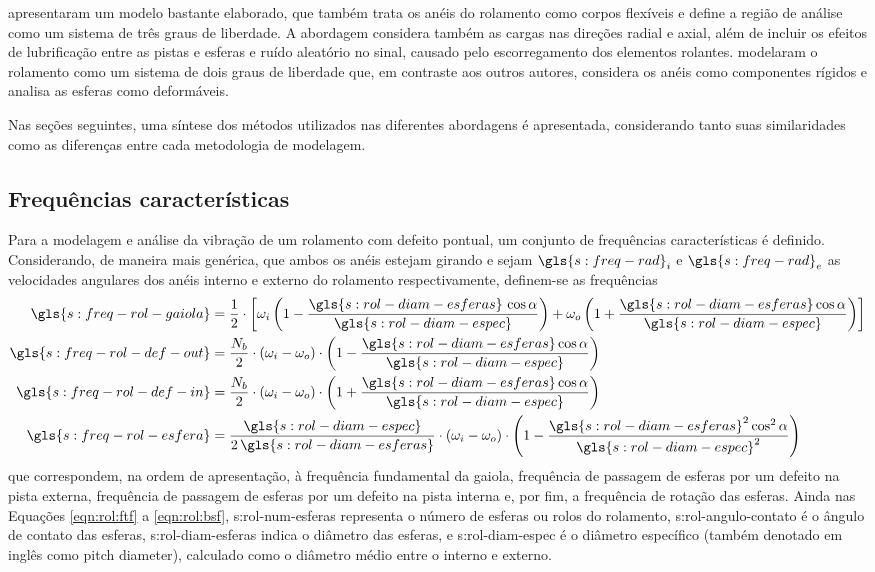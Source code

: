 \documentclass[12pt,openright,oneside,a4paper,
	chapter=TITLE,section=TITLE,
	english,brazil]{abntex2}
\begin{document}
	\citeauthor{sassi:2007} apresentaram um modelo bastante elaborado, que também trata os anéis do rolamento como corpos flexíveis e define a região de análise como um sistema de três graus de liberdade. A abordagem considera também as cargas nas direções radial e axial, além de incluir os efeitos de lubrificação entre as pistas e esferas e ruído aleatório no sinal, causado pelo escorregamento dos elementos rolantes.	\citeauthor{patil:2010} modelaram o rolamento como um sistema de dois graus de liberdade que, em contraste aos outros autores, considera os anéis como componentes rígidos e analisa as esferas como deformáveis.
	
	Nas seções seguintes, uma síntese dos métodos utilizados nas diferentes abordagens é apresentada, considerando tanto suas similaridades como as diferenças entre cada metodologia de modelagem.
	
	\subsection{Frequências características}
	Para a modelagem e análise da vibração de um rolamento com defeito pontual, um conjunto de frequências características é definido. Considerando, de maneira mais genérica, que ambos os anéis estejam girando e sejam $ \gls{s:freq-rad}_i $ e $ \gls{s:freq-rad}_e $ as velocidades angulares dos anéis interno e externo do rolamento respectivamente, definem-se as frequências \cite{sassi:2007}
	\begin{align}
		\gls{s:freq-rol-gaiola} &= \frac{1}{2}\cdot\left[ \omega_i\left(1-\frac{\gls{s:rol-diam-esferas}\,\cos\alpha}{\gls{s:rol-diam-espec}} \right) + \omega_o\left(1+\frac{\gls{s:rol-diam-esferas}\cos\alpha}{\gls{s:rol-diam-espec}} \right) \right] \label{eqn:rol:ftf}\\
		\gls{s:freq-rol-def-out} &= \frac{N_b}{2}\cdot(\omega_i-\omega_o)\cdot\left(1-\frac{\gls{s:rol-diam-esferas}\cos\alpha}{\gls{s:rol-diam-espec}} \right) \label{eqn:rol:bpfo}\\
		\gls{s:freq-rol-def-in} &= \frac{N_b}{2}\cdot(\omega_i-\omega_o)\cdot\left(1+\frac{\gls{s:rol-diam-esferas}\cos\alpha}{\gls{s:rol-diam-espec}} \right) \label{eqn:rol:bpfi}\\
		\gls{s:freq-rol-esfera} &= \frac{\gls{s:rol-diam-espec}}{2\,\gls{s:rol-diam-esferas}}\cdot(\omega_i-\omega_o)\cdot\left(1-\frac{\gls{s:rol-diam-esferas}^2\cos^2\alpha}{\gls{s:rol-diam-espec}^2} \right) \label{eqn:rol:bsf}
	\end{align}
	que correspondem, na ordem de apresentação, à frequência fundamental da gaiola, frequência de passagem de esferas por um defeito na pista externa, frequência de passagem de esferas por um defeito na pista interna e, por fim, a frequência de rotação das esferas. Ainda nas Equações \ref{eqn:rol:ftf} a \ref{eqn:rol:bsf}, \gls{s:rol-num-esferas} representa o número de esferas ou rolos do rolamento, \gls{s:rol-angulo-contato} é o ângulo de contato das esferas, \gls{s:rol-diam-esferas} indica o diâmetro das esferas, e \gls{s:rol-diam-espec} é o diâmetro específico (também denotado em inglês como \foreignlanguage{english}{pitch diameter}), calculado como o diâmetro médio entre o interno e externo.
	
\end{document}
